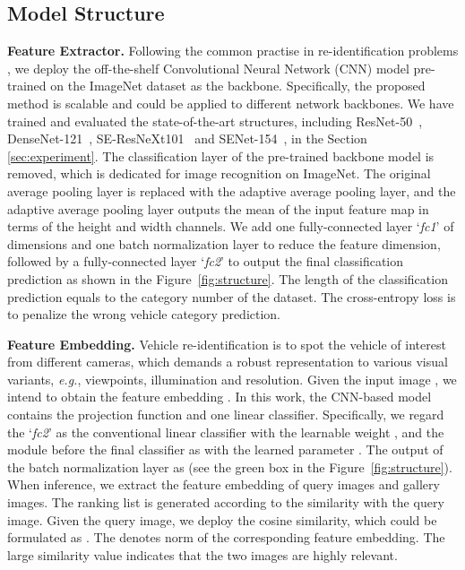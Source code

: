 \documentclass[journal]{IEEEtran}
\def\eg{\emph{e.g.}}
\begin{document}
\subsection{Model Structure} 
\label{sec:structure}
\noindent\textbf{Feature Extractor.} Following the common practise in  re-identification problems \cite{liu2016deep,zheng@joint}, we deploy the off-the-shelf Convolutional  Neural Network (CNN) model pre-trained on the ImageNet dataset \cite{russakovsky2015imagenet} as the backbone. Specifically, the proposed method is scalable and could be applied to different network backbones. We have trained and evaluated the state-of-the-art structures, including ResNet-50~\cite{he2018deep}, DenseNet-121~\cite{huang2017densely}, SE-ResNeXt101~\cite{hu2018senet} and SENet-154~\cite{hu2018senet}, in the Section \ref{sec:experiment}. The classification layer of the pre-trained backbone model is removed, which is dedicated for image recognition on ImageNet. The original average pooling layer is replaced with the adaptive average pooling layer, and the adaptive average pooling layer outputs the mean of the input feature map in terms of the height and width channels. We add one fully-connected layer `\emph{fc1}' of  dimensions and one batch normalization layer to reduce the feature dimension, followed by a fully-connected layer `\emph{fc2}' to output the final classification prediction as shown in the Figure~\ref{fig:structure}. The length of the classification prediction equals to the category number of the dataset. The cross-entropy loss is to penalize the wrong vehicle category prediction.

\noindent\textbf{Feature Embedding.} Vehicle re-identification is to spot the vehicle of interest from different cameras, which demands a robust representation to various visual variants, \eg, viewpoints, illumination and resolution. Given the input image , we intend to obtain the feature embedding . In this work, the CNN-based model contains the projection function  and one linear classifier. Specifically, we regard the `\emph{fc2}' as the conventional linear classifier with the learnable weight , and the module before the final classifier as  with the learned parameter . 
The output of the batch normalization layer as  (see the green box in the Figure~\ref{fig:structure}).
When inference, we extract the feature embedding of query images and gallery images. The ranking list is generated according to the similarity with the query image. Given the query image, we deploy the cosine similarity, which could be formulated as . The  denotes  norm of the corresponding feature embedding. The large similarity value indicates that the two images are highly relevant.
\end{document}
